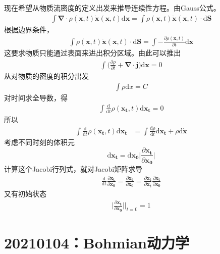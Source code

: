 \documentclass[12pt]{article}
\begin{document}
    现在希望从物质流密度的定义出发来推导连续性方程。由Gauss公式。
    \begin{align*}
        \int \bm{\nabla} \cdot \rho(\bm{x},t) \bm{\dot{x}}(\bm{x},t) \mathrm{d}\bm{x} = \int \rho(\bm{x},t) \bm{\dot{x}}(\bm{x},t) \cdot \mathrm{d}\bm{S}
    \end{align*}
    根据边界条件，
    \begin{align*}
        \int \rho(\bm{x},t) \bm{\dot{x}}(\bm{x},t) \cdot \mathrm{d}\bm{S} = \int -\frac {\partial \rho(\bm{x},t)}{\partial t} \mathrm{d}\bm{x}
    \end{align*}
    这要求物质只能通过表面来进出积分区域。由此可以推出
    \begin{align*}
        \int \bigg(\frac {\partial \rho}{\partial t} + \bm{\nabla \cdot j}\bigg) \mathrm{d}\bm{x} = 0 
    \end{align*}
    从对物质的密度的积分出发
    \begin{align*}
        \int \rho \mathrm{d}x = C
    \end{align*}
    对时间求全导数，得
    \begin{align*}
        \int \frac {\mathrm{d}}{\mathrm{d}t}\rho(\bm{x_t},t)\mathrm{d}\bm{x_t} = 0
    \end{align*}
    所以
    \begin{align*}
    \int \frac {\mathrm{d}}{\mathrm{d}t}\rho(\bm{x_t},t)\mathrm{d}\bm{x_t} &= \int \frac {\mathrm{d}\rho}{\mathrm{d}t}\mathrm{d}\bm{x_t} + \rho \mathrm{d}\bm{\dot{x}}
    \end{align*}
    考虑不同时刻的体积元
    \begin{equation*}
        \mathrm{d}\bm{x_t} = \mathrm{d}\bm{x_0} \bigg|\frac {\partial \bm{x_t}}{\partial \bm{x_0}}\bigg|
    \end{equation*}
    计算这个Jacobi行列式，就对Jacobi矩阵求导
    \begin{align*}
        \frac {\mathrm{d}}{\mathrm{d}t} \frac {\partial \bm{x_t}}{\partial \bm{x_0}} = \frac {\partial \bm{\dot{x}_t}}{\partial \bm{x_0}} = \frac {\partial \bm{\dot{x}_t}}{\partial \bm{x_t}} \frac {\partial \bm{x_t}}{\partial \bm{x_0}}
    \end{align*}
    又有初始状态
    \begin{align*}
        \bigg|\frac {\partial \bm{x_t}}{\partial \bm{x_0}} \bigg|\Bigg|_{t=0} = 1
    \end{align*}

\section{20210104：Bohmian动力学}
\end{document}

